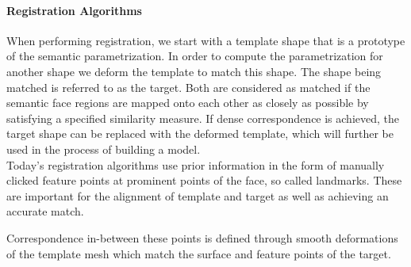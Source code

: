 \paragraph{Registration Algorithms}
When performing registration, we start with a template shape that is a prototype of the semantic parametrization. In order to compute the parametrization for another shape we deform the template to match this shape. The shape being matched is referred to as the target. Both are considered as matched if the semantic face regions are mapped onto each other as closely as possible by satisfying a specified similarity measure. If dense correspondence is achieved, the target shape can be replaced with the deformed template, which will further be used in the process of building a model.\\
Today's registration algorithms use prior information in the form of manually clicked feature points at prominent points of the face, so called landmarks. These are important for the alignment of template and target as well as achieving an accurate match. Correspondence in-between these points is defined through smooth deformations of the template mesh which match the surface and feature points of the target. 

